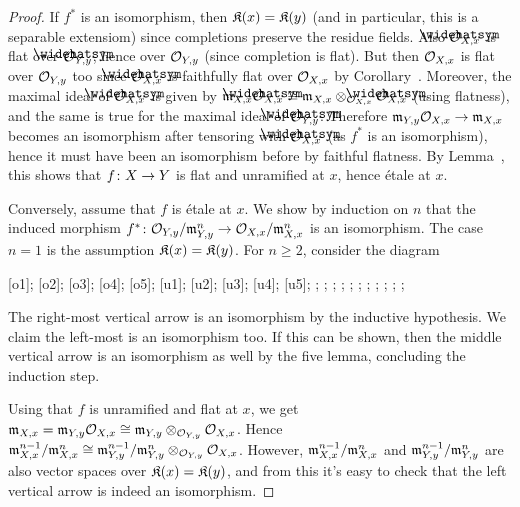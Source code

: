 \documentclass[a4paper,parskip=half,numbers=enddot, DIV=12]{scrreprt}
\renewcommand{\geq}{\geqslant}
\begin{document}
\begin{proof}
	If $f^*$ is an isomorphism, then $\mathfrak{K}(x)=\mathfrak{K}(y)$ (and in particular, this is a separable extensiom) since completions preserve the residue fields. Also $\roof{\Oo}_{X,x}$ is flat over $\roof{\Oo}_{Y,y}$, hence over $\mathcal{O}_{Y,y}$ (since completion is flat). But then $\mathcal{O}_{X,x}$ is flat over $\mathcal{O}_{Y,y}$ too since $\roof{\Oo}_{X,x}$ is faithfully flat over $\mathcal{O}_{X,x}$ by Corollary~. Moreover, the maximal ideal of $\roof{\Oo}_{X,x}$ is given by $\mm_{X,x}\roof{\Oo}_{X,x}\cong \mm_{X,x}\otimes_{\Oo_{X,x}}\roof{\Oo}_{X,x}$ (using flatness), and the same is true for the maximal ideal of $\roof{\Oo}_{Y,y}$. Therefore $\mm_{Y,y}\Oo_{X,x}\morphism\mm_{X,x}$ becomes an isomorphism after tensoring with $\roof{\Oo}_{X,x}$ (as $f^*$ is an isomorphism), hence it must have been an isomorphism before by faithful flatness. By Lemma~, this shows that $f\colon X\morphism Y$ is flat and unramified at $x$, hence étale at $x$.
	
	Conversely, assume that $f$ is étale at $x$. We show by induction on $n$ that the induced morphism $f^*\colon \Oo_{Y,y}/\mm_{Y,y}^n\morphism\Oo_{X,x}/\mm_{X,x}^n$ is an isomorphism. The case $n=1$ is the assumption $\mathfrak{K}(x)=\mathfrak{K}(y)$. For $n\geq 2$, consider the diagram
	\begin{diagram*}
		[o1];
		[o2];
		[o3];
		[o4];
		[o5];
		[u1];
		[u2];
		[u3];
		[u4];
		[u5];
		\scriptsize
		;
		;
		;
		;
		;
		;
		;
		;
		;
		;
		;
	\end{diagram*}
	The right-most vertical arrow is an isomorphism by the inductive hypothesis. We claim the left-most is an isomorphism too. If this can be shown, then the middle vertical arrow is an isomorphism as well by the five lemma, concluding the induction step.
	
	Using that $f$ is unramified and flat at $x$, we get $\mathfrak{m}_{X,x}=\mathfrak{m}_{Y,y}\mathcal{O}_{X,x}\cong \mathfrak{m}_{Y,y}\otimes_{\mathcal{O}_{Y,y}}\mathcal{O}_{X,x}$. Hence $\mathfrak{m}_{X,x}^{n-1}/\mathfrak{m}_{X,x}^n\cong \mathfrak{m}_{Y,y}^{n-1}/\mathfrak{m}_{Y,y}^n\otimes_{\mathcal{O}_{Y,y}}\mathcal{O}_{X,x}$. However, $\mathfrak{m}_{X,x}^{n-1}/\mathfrak{m}_{X,x}^n$ and $\mathfrak{m}_{Y,y}^{n-1}/\mathfrak{m}_{Y,y}^n$ are also vector spaces over $\mathfrak{K}(x)=\mathfrak{K}(y)$, and from this it's easy to check that the left vertical arrow is indeed an isomorphism.
\end{proof}
\end{document}
